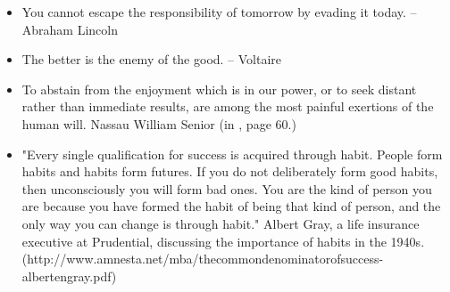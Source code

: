 \documentclass[a4paper, 11pt]{report}
\begin{document}
\begin{itemize}
	\item You cannot escape the responsibility of tomorrow by evading it today. -- Abraham Lincoln

	\item The better is the enemy of the good. -- Voltaire

	\item To abstain from the enjoyment which is in our power, or to seek distant rather than immediate results, are among the most painful exertions of the human will. Nassau William Senior (in \citet{senior1836outline}, page 60.)

	\item "Every single qualification for success is acquired through habit. People form habits and habits form futures. If you do not deliberately form good habits, then unconsciously you will form bad ones. You are the kind of person you are because you have formed the habit of being that kind of person, and the only way you can change is through habit." Albert Gray, a life insurance executive at Prudential, discussing the importance of habits in the 1940s. (http://www.amnesta.net/mba/thecommondenominatorofsuccess-albertengray.pdf)



\end{itemize}


\newpage
\printbibliography
\end{document}
